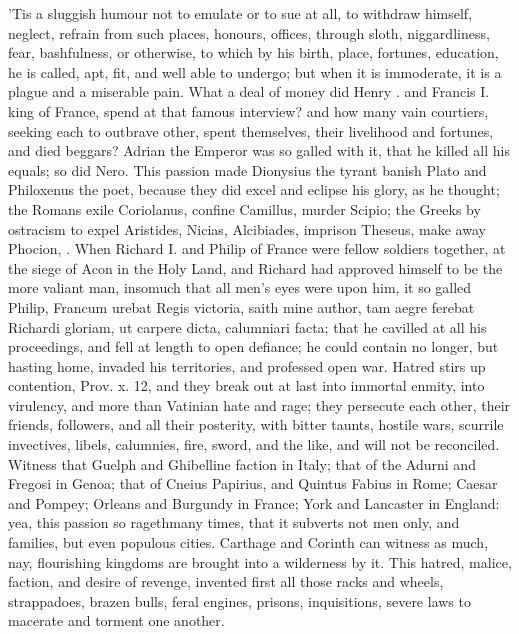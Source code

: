 {'Tis a sluggish humour not to emulate or to sue at all, to withdraw
himself, neglect, refrain from such places, honours, offices, through
sloth, niggardliness, fear, bashfulness, or otherwise, to which by his
birth, place, fortunes, education, he is called, apt, fit, and well
able to undergo; but when it is immoderate, it is a plague and a
miserable pain. What a deal of money did Henry . and Francis I.
king of France, spend at that famous interview? and how many vain
courtiers, seeking each to outbrave other, spent themselves, their
livelihood and fortunes, and died beggars? Adrian the Emperor was
so galled with it, that he killed all his equals; so did Nero. This
passion made Dionysius the tyrant banish Plato and Philoxenus the
poet, because they did excel and eclipse his glory, as he thought; the
Romans exile Coriolanus, confine Camillus, murder Scipio; the Greeks by
ostracism to expel Aristides, Nicias, Alcibiades, imprison Theseus,
make away Phocion, \etc{}. When Richard I. and Philip of France were fellow
soldiers together, at the siege of Acon in the Holy Land, and Richard
had approved himself to be the more valiant man, insomuch that all
men's eyes were upon him, it so galled Philip, Francum urebat Regis
victoria, saith mine author, tam aegre ferebat Richardi gloriam,
ut carpere dicta, calumniari facta; that he cavilled at all his
proceedings, and fell at length to open defiance; he could contain no
longer, but hasting home, invaded his territories, and professed open
war. Hatred stirs up contention, Prov. x. 12, and they break out at
last into immortal enmity, into virulency, and more than Vatinian hate
and rage; they persecute each other, their friends, followers,
and all their posterity, with bitter taunts, hostile wars, scurrile
invectives, libels, calumnies, fire, sword, and the like, and will not
be reconciled. Witness that Guelph and Ghibelline faction in Italy;
that of the Adurni and Fregosi in Genoa; that of Cneius Papirius, and
Quintus Fabius in Rome; Caesar and Pompey; Orleans and Burgundy in
France; York and Lancaster in England: yea, this passion so
ragethmany times, that it subverts not men only, and families,
but even populous cities. Carthage and Corinth can witness as
much, nay, flourishing kingdoms are brought into a wilderness by it.
This hatred, malice, faction, and desire of revenge, invented first all
those racks and wheels, strappadoes, brazen bulls, feral engines,
prisons, inquisitions, severe laws to macerate and torment one another.
}
